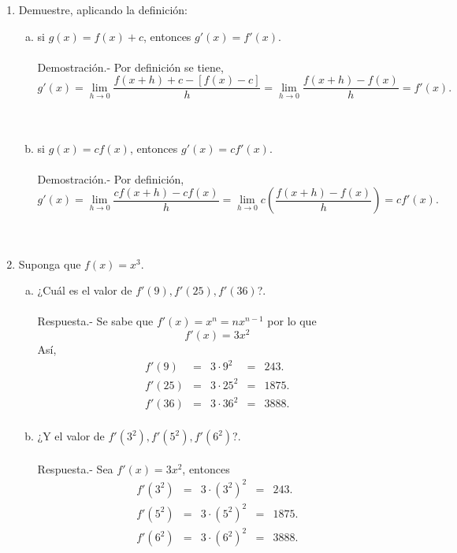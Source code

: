 \begin{enumerate}[\bfseries 1]
   \item Demuestre, aplicando la definición:\\

   \begin{enumerate}[(a)]

       \item si $g(x)=f(x)+c$, entonces $g'(x)=f'(x)$.\\\\
	   Demostración.-\; Por definición se tiene,
	   $$g'(x) = \lim_{h\to 0} \dfrac{f(x+h)+c-[f(x)-c]}{h} = \lim_{h\to 0}\dfrac{f(x+h)-f(x)}{h}=f'(x).$$\\\\

       \item si $g(x)=cf(x)$, entonces $g'(x)=cf'(x)$.\\\\
	   Demostración.-\; Por definición,
	   $$g'(x) = \lim_{h\to 0} \dfrac{cf(x+h)-cf(x)}{h} = \lim_{h\to 0}c\left(\dfrac{f(x+h)-f(x)}{h}\right)=cf'(x).$$\\\\

    \end{enumerate}

    \item Suponga que $f(x)=x^3$.\\

	\begin{enumerate}[(a)]

	    \item ¿Cuál es el valor de $f'(9), f'(25), f'(36)$?.\\\\
		Respuesta.-\; Se sabe que $f'(x)=x^n = nx^{n-1}$ por lo que 
		$$f'(x)=3x^{2}$$
		Así,
		$$\begin{array}{rclcl}
		    f'(9) &=& 3\cdot 9^{2} &=& 243.\\
		    f'(25) &=& 3\cdot 25^{2} &=& 1875.\\
		    f'(36) &=& 3\cdot 36^{2} &=& 3888.\\
		\end{array}$$
		\vspace{.7cm}

	    \item ¿Y el valor de $f'\left(3^2\right),f'\left(5^2\right),f'\left(6^2\right)$?.\\\\
		Respuesta.-\; Sea $f'(x)=3x^{2}$, entonces
		$$\begin{array}{rclcl}
		    f'\left(3^2\right) &=& 3\cdot \left(3^2\right)^{2} &=& 243.\\
		    f'\left(5^2\right) &=& 3\cdot \left(5^2\right)^{2} &=& 1875.\\
		    f'\left(6^2\right) &=& 3\cdot \left(6^2\right)^{2} &=& 3888.\\
		\end{array}$$
		\vspace{.7cm}



\end{enumerate}
\end{enumerate}
